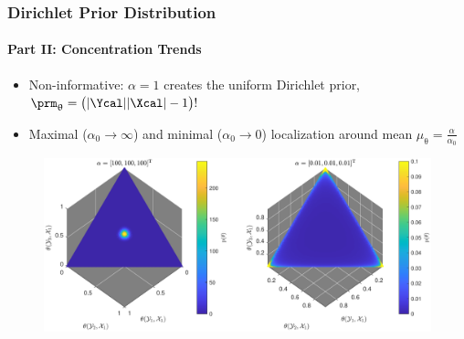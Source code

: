 \documentclass[aspectratio=169,usenames,dvipsnames]{beamer}
\begin{document}
\begin{frame}
\frametitle{Dirichlet Prior Distribution}
\framesubtitle{Part II: Concentration Trends}

\begin{itemize}
\item Non-informative: $\alpha = 1$ creates the uniform Dirichlet prior, $\prm_{\uptheta} = \big( |\Ycal||\Xcal|-1 \big)!$
\vspace{0.5em}
\item Maximal ($\alpha_0 \to \infty$) and minimal ($\alpha_0 \to 0$) localization around mean $\mu_{\uptheta} = \frac{\alpha}{\alpha_0}$
\end{itemize}

\begin{figure}
\centering
\includegraphics[width=0.8\linewidth]{P_theta_hrz.pdf}
\end{figure}


\end{frame}
\end{document}
